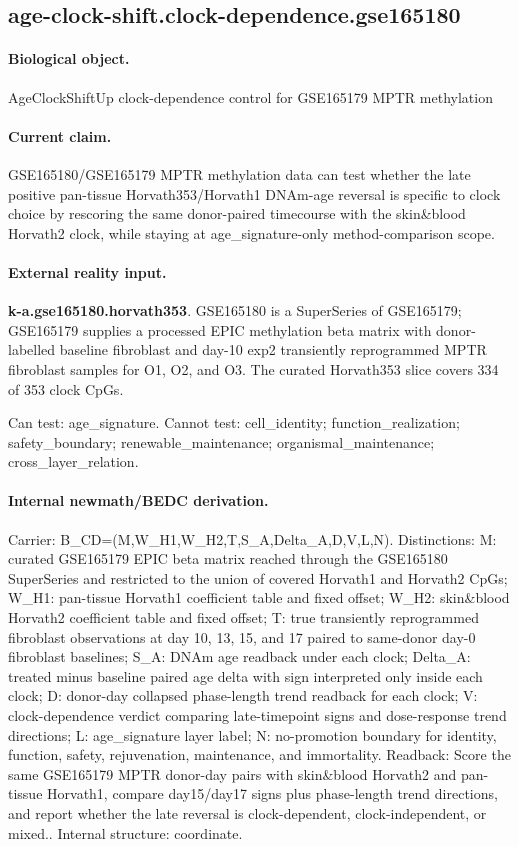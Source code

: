 \subsection{age-clock-shift.clock-dependence.gse165180}

\paragraph{Biological object.} AgeClockShiftUp clock-dependence control for GSE165179 MPTR methylation

\paragraph{Current claim.} GSE165180/GSE165179 MPTR methylation data can test whether the late positive pan-tissue Horvath353/Horvath1 DNAm-age reversal is specific to clock choice by rescoring the same donor-paired timecourse with the skin\&blood Horvath2 clock, while staying at age\_signature-only method-comparison scope.

\paragraph{External reality input.}
\textbf{k-a.gse165180.horvath353}. GSE165180 is a SuperSeries of GSE165179; GSE165179 supplies a processed EPIC methylation beta matrix with donor-labelled baseline fibroblast and day-10 exp2 transiently reprogrammed MPTR fibroblast samples for O1, O2, and O3. The curated Horvath353 slice covers 334 of 353 clock CpGs.

Can test: age\_signature. Cannot test: cell\_identity; function\_realization; safety\_boundary; renewable\_maintenance; organismal\_maintenance; cross\_layer\_relation.

\paragraph{Internal newmath/BEDC derivation.} Carrier: B\_CD=(M,W\_H1,W\_H2,T,S\_A,Delta\_A,D,V,L,N). Distinctions: M: curated GSE165179 EPIC beta matrix reached through the GSE165180 SuperSeries and restricted to the union of covered Horvath1 and Horvath2 CpGs; W\_H1: pan-tissue Horvath1 coefficient table and fixed offset; W\_H2: skin\&blood Horvath2 coefficient table and fixed offset; T: true transiently reprogrammed fibroblast observations at day 10, 13, 15, and 17 paired to same-donor day-0 fibroblast baselines; S\_A: DNAm age readback under each clock; Delta\_A: treated minus baseline paired age delta with sign interpreted only inside each clock; D: donor-day collapsed phase-length trend readback for each clock; V: clock-dependence verdict comparing late-timepoint signs and dose-response trend directions; L: age\_signature layer label; N: no-promotion boundary for identity, function, safety, rejuvenation, maintenance, and immortality. Readback: Score the same GSE165179 MPTR donor-day pairs with skin\&blood Horvath2 and pan-tissue Horvath1, compare day15/day17 signs plus phase-length trend directions, and report whether the late reversal is clock-dependent, clock-independent, or mixed.. Internal structure: coordinate.

